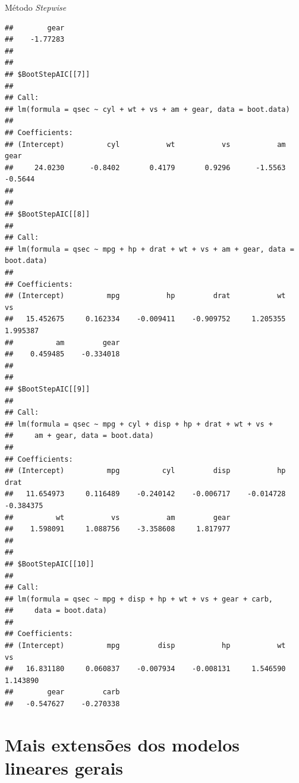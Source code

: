 \documentclass{beamer}\usepackage[]{graphicx}\usepackage[]{color}
\makeatletter
\newenvironment{kframe}{%
 \def\at@end@of@kframe{}%
 \ifinner\ifhmode%
  \def\at@end@of@kframe{\end{minipage}}%
  \begin{minipage}{\columnwidth}%
 \fi\fi%
 \def\FrameCommand##1{\hskip\@totalleftmargin \hskip-\fboxsep
 \colorbox{shadecolor}{##1}\hskip-\fboxsep
     \hskip-\linewidth \hskip-\@totalleftmargin \hskip\columnwidth}%
 \MakeFramed {\advance\hsize-\width
   \@totalleftmargin\z@ \linewidth\hsize
   \@setminipage}}%
 {\par\unskip\endMakeFramed%
 \at@end@of@kframe}
\newenvironment{knitrout}{}{} %
\renewenvironment{knitrout}{\setlength{\topsep}{0mm}}{}
\makeatother
\begin{document}
\begin{frame}[fragile]{Método \emph{Stepwise}}
\begin{knitrout}
\begin{kframe}
\begin{verbatim}
##        gear  
##    -1.77283  
## 
## 
## $BootStepAIC[[7]]
## 
## Call:
## lm(formula = qsec ~ cyl + wt + vs + am + gear, data = boot.data)
## 
## Coefficients:
## (Intercept)          cyl           wt           vs           am         gear  
##     24.0230      -0.8402       0.4179       0.9296      -1.5563      -0.5644  
## 
## 
## $BootStepAIC[[8]]
## 
## Call:
## lm(formula = qsec ~ mpg + hp + drat + wt + vs + am + gear, data = boot.data)
## 
## Coefficients:
## (Intercept)          mpg           hp         drat           wt           vs  
##   15.452675     0.162334    -0.009411    -0.909752     1.205355     1.995387  
##          am         gear  
##    0.459485    -0.334018  
## 
## 
## $BootStepAIC[[9]]
## 
## Call:
## lm(formula = qsec ~ mpg + cyl + disp + hp + drat + wt + vs + 
##     am + gear, data = boot.data)
## 
## Coefficients:
## (Intercept)          mpg          cyl         disp           hp         drat  
##   11.654973     0.116489    -0.240142    -0.006717    -0.014728    -0.384375  
##          wt           vs           am         gear  
##    1.598091     1.088756    -3.358608     1.817977  
## 
## 
## $BootStepAIC[[10]]
## 
## Call:
## lm(formula = qsec ~ mpg + disp + hp + wt + vs + gear + carb, 
##     data = boot.data)
## 
## Coefficients:
## (Intercept)          mpg         disp           hp           wt           vs  
##   16.831180     0.060837    -0.007934    -0.008131     1.546590     1.143890  
##        gear         carb  
##   -0.547627    -0.270338
\end{verbatim}
\end{kframe}
\end{knitrout}

\end{frame}


\section{Mais extensões dos modelos lineares gerais}
\end{document}
